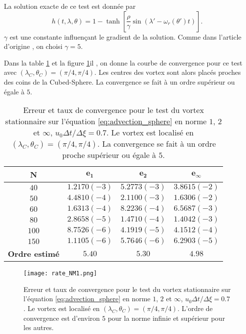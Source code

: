 La solution exacte de ce test est donnée par
\begin{equation}
h(t, \lambda, \theta) = 1 - \tanh \left[ \dfrac{\rho}{\gamma} \sin (\lambda' - \omega_r (\theta') t) \right].
\label{eq:NM_solexacte}
\end{equation}
$\gamma$ est une constante influençant le gradient de la solution. Comme dans l'article d'origine \cite{Nair2002}, on choisi $\gamma = 5$.

Dans la table \ref{tab:rate1_NM} et la figure \ref{fig:rate1_NM}il , on donne la courbe de convergence pour ce test avec $(\lambda_C, \theta_C)=(\pi /4 , \pi /4)$. Les centres des vortex sont alors placés proches des coins de la Cubed-Sphere. La convergence se fait à un ordre supérieur ou égale à $5$.

\begin{table}[htbp]
\begin{center}
\begin{tabular}{|c||c|c|c|}
\hline
\textbf{N}  & $\mathbf{e_1}$ & $\mathbf{e_2}$ & $\mathbf{e_{\infty}}$\\
\hline
\hline
$40$  & $1.2170 (-3)$ & $5.2773 (-3)$ & $3.8615 (-2)$ \\
$50$  & $4.4810 (-4)$ & $2.1100 (-3)$ & $1.6306 (-2)$ \\
$60$  & $1.6313 (-4)$ & $8.2236 (-4)$ & $6.5687 (-3)$ \\
$80$  & $2.8658 (-5)$ & $1.4710 (-4)$ & $1.4042 (-3)$ \\
$100$  & $8.7526 (-6)$ & $4.1919 (-5)$ & $4.1512 (-4)$ \\
$150$  & $1.1105 (-6)$ & $5.7646 (-6)$ & $6.2903 (-5)$ \\
\hline 
\hline
\textbf{Ordre estimé}& $5.40$ & $5.30$ & $4.98$\\
\hline
\end{tabular}
\end{center}
\caption{Erreur et taux de convergence pour le test du vortex stationnaire sur l'équation \eqref{eq:advection_sphere} en norme $1$, $2$ et $\infty$, $u_0 \Delta t / \Delta \xi = 0.7$. Le vortex est localisé en $(\lambda_C, \theta_C)=(\pi /4 , \pi /4)$. La convergence se fait à un ordre proche supérieur ou égale à $5$.}
\label{tab:rate1_NM}
\end{table} 

\begin{figure}[htbp]
\begin{center}
\texttt{[image: rate\_NM1.png]}
\end{center}
\caption{Erreur et taux de convergence pour le test du vortex stationnaire sur l'équation \eqref{eq:advection_sphere} en norme $1$, $2$ et $\infty$, $u_0 \Delta t / \Delta \xi = 0.7$. Le vortex est localisé en $(\lambda_C, \theta_C)=(\pi /4 , \pi /4)$. L'ordre de convergence est d'environ $5$ pour la norme infinie et supérieur pour les autres.}
\label{fig:rate1_NM}
\end{figure} 

